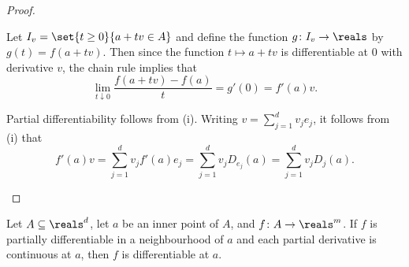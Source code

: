 \documentclass[article, a4paper, 11pt, oneside]{memoir}
\numberwithin{equation}{chapter}
\begin{document}
\begin{proof}
\begin{proofsec}
    \item[Proof of (i)]
    Let $I_v = \set{t \geq 0}{a+tv \in A}$ and define the function $g \colon I_v \to \reals$ by $g(t) = f(a + tv)$. Then since the function $t \mapsto a+tv$ is differentiable at $0$ with derivative $v$, the chain rule implies that
    \begin{equation*}
        \lim_{t \downarrow 0} \frac{f(a + tv) - f(a)}{t}
            = g'(0)
            = f'(a)v.
    \end{equation*}

    \item[Proof of (ii)]
    Partial differentiability follows from (i). Writing $v = \sum_{j=1}^d v_j e_j$, it follows from (i) that
    \begin{equation*}
        f'(a)v
            = \sum_{j=1}^d v_j f'(a)e_j
            = \sum_{j=1}^d v_j D_{e_j}(a)
            = \sum_{j=1}^d v_j D_j(a).
    \end{equation*}
\end{proofsec}
\end{proof}


\begin{theorem}
    \label{thm:continuous-partials-implies-differentiable}
    Let $A \subseteq \reals^d$, let $a$ be an inner point of $A$, and $f \colon A \to \reals^m$. If $f$ is partially differentiable in a neighbourhood of $a$ and each partial derivative is continuous at $a$, then $f$ is differentiable at $a$.
\end{theorem}
\end{document}
